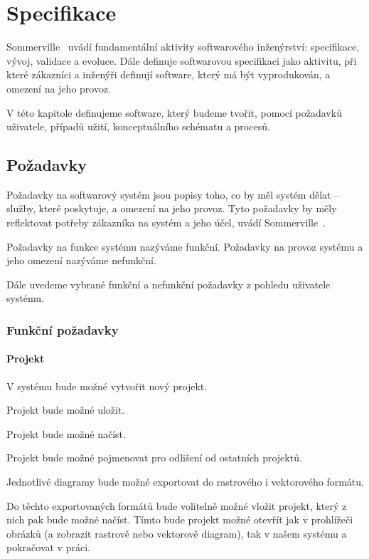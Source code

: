 \chapter{Specifikace}\label{chapter:specifikace}

Sommerville~\cite{sommerville_softwareengineering_2011} uvádí fundamentální aktivity softwarového inženýrství: specifikace, vývoj, validace a evoluce.
Dále definuje softwarovou specifikaci jako aktivitu, při které zákazníci a inženýři definují software, který má být vyprodukován, a omezení na jeho provoz.

V této kapitole definujeme software, který budeme tvořit, pomocí požadavků uživatele, případů užití, konceptuálního schématu a procesů.

\section{Požadavky}

Požadavky na softwarový systém jsou popisy toho, co by měl systém dělat -- služby, které poskytuje, a omezení na jeho provoz.
Tyto požadavky by měly reflektovat potřeby zákazníka na systém a jeho účel, uvádí Sommerville~\cite[s.~83]{sommerville_softwareengineering_2011}.

Požadavky na funkce systému nazýváme funkční.
Požadavky na provoz systému a jeho omezení nazýváme nefunkční.

Dále uvedeme vybrané funkční a nefunkční požadavky z pohledu uživatele systému.

\subsection{Funkční požadavky}

\subsubsection*{Projekt}
\begin{enumfp}
  \item V systému bude možné vytvořit nový projekt.
  \item Projekt bude možné uložit.
  \item Projekt bude možné načíst.
  \item Projekt bude možné pojmenovat pro odlišení od ostatních projektů.
  \item Jednotlivé diagramy bude možné exportovat do rastrového i vektorového formátu.
  \item Do těchto exportovaných formátů bude volitelně možné vložit projekt, který z nich pak bude možné načíst.
  Tímto bude projekt možné otevřít jak v prohlížeči obrázků (a zobrazit rastrově nebo vektorově diagram), tak v našem systému a pokračovat v práci.
\end{enumfp}

